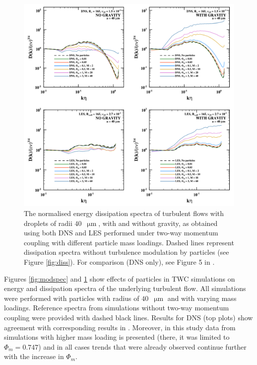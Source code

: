 \documentclass{pracamgren}
\begin{document}
\begin{figure}[ht]
\centering
\includegraphics[width=13.5cm]{figures/2-04_moddiss.pdf}
\caption{
The normalised energy dissipation spectra of turbulent flows with droplets of radii $40$~$\upmu\text{m}$, with and without gravity, as obtained using both DNS and LES performed under two-way momentum coupling with different particle mass loadings.
Dashed lines represent dissipation spectra without turbulence modulation by particles (see Figure \ref{fig:diss}).
For comparison (DNS only), see Figure 5 in \textcite{Rosa2020}.
}
\label{fig:moddiss}
\end{figure}

Figures \ref{fig:modspec} and \ref{fig:moddiss} show effects of particles in TWC simulations on energy and dissipation spectra of the underlying turbulent flow.
All simulations were performed with particles with radius of $40$~$\upmu\text{m}$ and with varying mass loadings.
Reference spectra from simulations without two-way momentum coupling were provided with dashed black lines.
Results for DNS (top plots) show agreement with corresponding results in \textcite[Figures 4 and 5 therein]{Rosa2020}.
Moreover, in this study data from simulations with higher mass loading is presented (there, it was limited to $\Phi_m = 0.747$) and in all cases trends that were already observed continue further with the increase in $\Phi_m$.
\end{document}
